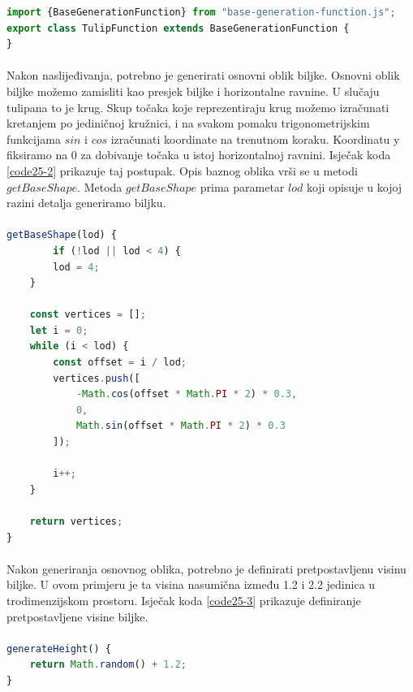 \documentclass[times, utf8, diplomski]{fer}
\begin{document}
\begin{lstlisting}[language=Javascript,caption=Naslijeđivanje razreda BaseGenerationFunction,label=code25-1]
import {BaseGenerationFunction} from "base-generation-function.js";
export class TulipFunction extends BaseGenerationFunction {
}
\end{lstlisting}

\paragraph{}
Nakon naslijeđivanja, potrebno je generirati osnovni oblik biljke. Osnovni oblik biljke 
možemo zamisliti kao presjek biljke i horizontalne ravnine. U slučaju tulipana to je krug.
Skup točaka koje reprezentiraju krug možemo izračunati kretanjem po jediničnoj kružnici, i 
na svakom pomaku trigonometrijskim funkcijama $sin$ i $cos$ izračunati koordinate na 
trenutnom koraku. Koordinatu y fiksiramo na 0 za dobivanje točaka u istoj horizontalnoj 
ravnini. Isječak koda \ref{code25-2} prikazuje taj postupak. Opis baznog oblika vrši se u 
metodi $getBaseShape$. Metoda $getBaseShape$ prima parametar $lod$ koji opisuje u kojoj 
razini detalja generiramo biljku.

\paragraph{}
\begin{lstlisting}[language=Javascript,caption=Generiranje osnovnog oblika biljke,label=code25-2]
getBaseShape(lod) {
		if (!lod || lod < 4) {
		lod = 4;
	}

	const vertices = [];
	let i = 0;
	while (i < lod) {
		const offset = i / lod;
		vertices.push([
			-Math.cos(offset * Math.PI * 2) * 0.3,
			0,
			Math.sin(offset * Math.PI * 2) * 0.3
		]);

		i++;
	}

	return vertices;
}
\end{lstlisting}

\paragraph{}
Nakon generiranja osnovnog oblika, potrebno je definirati pretpostavljenu visinu biljke.
U ovom primjeru je ta visina nasumična između 1.2 i 2.2 jedinica u trodimenzijskom 
prostoru. Isječak koda \ref{code25-3} prikazuje definiranje pretpostavljene visine biljke.
\paragraph{}
\begin{lstlisting}[language=Javascript,caption=Generiranje visine biljke,label=code25-3]
generateHeight() {
	return Math.random() + 1.2;
}
\end{lstlisting}
\end{document}
